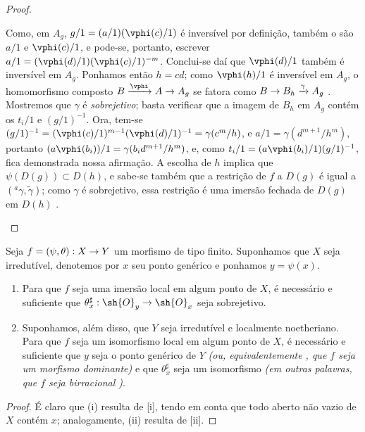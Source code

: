 \documentclass[oneside]{amsart}
\makeatletter
\newcommand{\ega@arrow}[2]{\mathchoice{#1}{#2}{#2}{#2}}
\renewcommand{\to}{\ega@arrow{\longrightarrow}{\rightarrow}}
\let\EGAOriginalLabel\label
\renewcommand{\label}[1]{\phantomsection\EGAOriginalLabel{#1}}
\makeatother
\begin{document}
\begin{proof}
\begin{enumerate}
    Como, em $A_g$, $g/1=(a/1)(\vphi(c)/1)$ é inversível por definição, também o são $a/1$ e $\vphi(c)/1$, e pode-se, portanto, escrever $a/1=(\vphi(d)/1)(\vphi(c)/1)^{-m}$.
    Conclui-se daí que $\vphi(d)/1$ também é inversível em $A_g$.
    Ponhamos então $h=cd$;
    como $\vphi(h)/1$ é inversível em $A_g$, o homomorfismo composto $B\xrightarrow{\vphi}A\to A_g$ se fatora como $B\to B_h\xrightarrow{\gamma}A_g$ .
    Mostremos que $\gamma$ é \emph{sobrejetivo};
    basta verificar que a imagem de $B_h$ em $A_g$ contém os $t_i/1$ e $(g/1)^{-1}$.
    Ora, tem-se $(g/1)^{-1}=(\vphi(c)/1)^{m-1}(\vphi(d)/1)^{-1}=\gamma(c^m/h)$, e $a/1=\gamma(d^{m+1}/h^m)$, portanto $(a\vphi(b_i))/1=\gamma(b_id^{m+1}/h^m)$, e, como $t_i/1=(a\vphi(b_i)/1)(g/1)^{-1}$, fica demonstrada nossa afirmação.
    A escolha de $h$ implica que $\psi(D(g))\subset D(h)$, e sabe-se também que a restrição de $f$ a $D(g)$ é igual a $({}^a\gamma,\widetilde{\gamma})$;
    como $\gamma$ é sobrejetivo, essa restrição é uma imersão fechada de $D(g)$ em $D(h)$ .
\end{enumerate}
\end{proof}

\begin{corollary}[6.5.5]
\label{I.6.5.5}
Seja $f=(\psi,\theta):X\to Y$ um morfismo de tipo finito.
Suponhamos que $X$ seja irredutível, denotemos por $x$ seu ponto genérico e ponhamos $y=\psi(x)$.
\begin{enumerate}
  \item[{\rm(i)}] Para que $f$ seja uma imersão local em algum ponto de $X$, é necessário e suficiente que $\theta_x^\sharp:\sh{O}_y\to\sh{O}_x$ seja sobrejetivo.
  \item[{\rm(ii)}] Suponhamos, além disso, que $Y$ seja irredutível e localmente noetheriano.
    Para que $f$ seja um isomorfismo local em algum ponto de $X$, é necessário e suficiente que $y$ seja o ponto genérico de $Y$ \emph{(ou, equivalentemente , que $f$ seja um morfismo \emph{dominante})} e que $\theta_x^\sharp$ seja um isomorfismo \emph{(em outras palavras, que $f$ seja \emph{birracional} )}.
\end{enumerate}
\end{corollary}

\begin{proof}
É claro que (i) resulta de [i], tendo em conta que todo aberto não vazio de $X$ contém $x$;
analogamente, (ii) resulta de [ii].
\end{proof}
\end{document}
